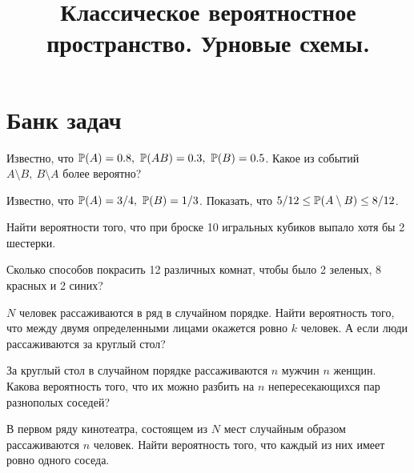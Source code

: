 

\title{Классическое вероятностное пространство. Урновые схемы.} 
\date{\vspace{-1cm}}


\maketitle

\section*{Банк задач}
\begin{problem}
    Известно, что $\operatorname{\mathbb{P}}(A) = 0.8,\ \operatorname{\mathbb{P}}(AB) = 0.3,\ \operatorname{\mathbb{P}}(B) = 0.5$.
    Какое из событий $A \setminus B,\ B \setminus A$ более вероятно?
\end{problem}

\begin{problem}
    Известно, что $\operatorname{\mathbb{P}}(A) = 3 / 4,\ \operatorname{\mathbb{P}}(B) = 1 / 3$.
    Показать, что $5 / 12 \leq \operatorname{\mathbb{P}}(A \setminus B) \leq 8 / 12$.
\end{problem}

\begin{problem}
    Найти вероятности того, что при броске 10 игральных кубиков выпало хотя бы 2 шестерки.
\end{problem}

\begin{problem}
    Сколько способов покрасить 12 различных комнат, чтобы было 2 зеленых, 8 красных и 2 синих?
\end{problem}

\begin{problem}
    $N$ человек рассаживаются в ряд в случайном порядке.
    Найти вероятность того, что между двумя определенными лицами окажется ровно $k$ человек.
    А если люди рассаживаются за круглый стол?
\end{problem}

\begin{problem}
    За круглый стол в случайном порядке рассаживаются $n$ мужчин $n$ женщин.
    Какова вероятность того, что их можно разбить на $n$ непересекающихся пар разнополых соседей?
\end{problem}

\begin{problem}
    В первом ряду кинотеатра, состоящем из $N$ мест случайным образом рассаживаются $n$ человек.
    Найти вероятность того, что каждый из них имеет ровно одного соседа.
\end{problem}

